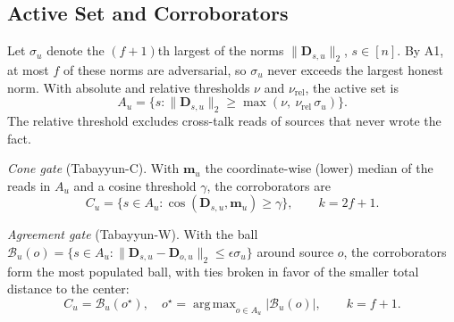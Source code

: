 \documentclass[journal]{IEEEtran}
\theoremstyle{remark}
\newcommand{\TabC}{\mbox{Tabayyun-C}}
\newcommand{\TabW}{\mbox{Tabayyun-W}}
\DeclareMathOperator*{\argmax}{arg\,max}
\begin{document}
\subsection{Active Set and Corroborators}
Let $\sigma_u$ denote the $(f+1)$th largest of the norms $\|\bm{D}_{s,u}\|_2$, $s\in[n]$. By A1, at most $f$ of these norms are adversarial, so $\sigma_u$ never exceeds the largest honest norm. With absolute and relative thresholds $\nu$ and $\nu_{\mathrm{rel}}$, the active set is
\begin{equation}\label{eq:active}
A_u=\{s:\|\bm{D}_{s,u}\|_2\ge\max(\nu,\ \nu_{\mathrm{rel}}\,\sigma_u)\}.
\end{equation}
The relative threshold excludes cross-talk reads of sources that never wrote the fact.

\emph{Cone gate} (\TabC). With $\bm{m}_u$ the coordinate-wise (lower) median of the reads in $A_u$ and a cosine threshold $\gamma$, the corroborators are
\begin{equation}\label{eq:cone}
C_u=\{s\in A_u:\cos(\bm{D}_{s,u},\bm{m}_u)\ge\gamma\},\qquad k=2f+1.
\end{equation}

\emph{Agreement gate} (\TabW). With the ball $\mathcal{B}_u(o)=\{s\in A_u:\|\bm{D}_{s,u}-\bm{D}_{o,u}\|_2\le\epsilon\sigma_u\}$ around source $o$, the corroborators form the most populated ball, with ties broken in favor of the smaller total distance to the center:
\begin{equation}\label{eq:agree}
C_u=\mathcal{B}_u(o^\star),\quad o^\star=\argmax_{o\in A_u}|\mathcal{B}_u(o)|,\qquad k=f+1.
\end{equation}
\end{document}
